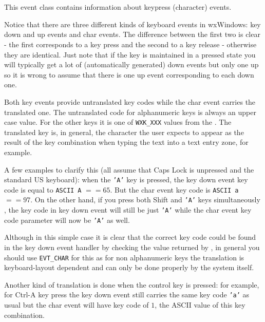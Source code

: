\section{}\label{wxkeyevent}

This event class contains information about keypress (character) events.

Notice that there are three different kinds of keyboard events in wxWindows:
key down and up events and char events. The difference between the first two
is clear - the first corresponds to a key press and the second to a key
release - otherwise they are identical. Just note that if the key is
maintained in a pressed state you will typically get a lot of (automatically
generated) down events but only one up so it is wrong to assume that there is
one up event corresponding to each down one.

Both key events provide untranslated key codes while the char event carries
the translated one. The untranslated code for alphanumeric keys is always
an upper case value. For the other keys it is one of {\tt WXK\_XXX} values
from the . The translated key is, in
general, the character the user expects to appear as the result of the key
combination when typing the text into a text entry zone, for example.

A few examples to clarify this (all assume that {\sc Caps Lock} is unpressed
and the standard US keyboard): when the {\tt 'A'} key is pressed, the key down
event key code is equal to {\tt ASCII A} $== 65$. But the char event key code
is {\tt ASCII a} $== 97$. On the other hand, if you press both {\sc Shift} and
{\tt 'A'} keys simultaneously , the key code in key down event will still be
just {\tt 'A'} while the char event key code parameter will now be {\tt 'A'}
as well.

Although in this simple case it is clear that the correct key code could be
found in the key down event handler by checking the value returned by
, in general you should use
{\tt EVT\_CHAR} for this as for non alphanumeric keys the translation is
keyboard-layout dependent and can only be done properly by the system itself.

Another kind of translation is done when the control key is pressed: for
example, for {\sc Ctrl-A} key press the key down event still carries the
same key code {\tt 'a'} as usual but the char event will have key code of
$1$, the ASCII value of this key combination.

